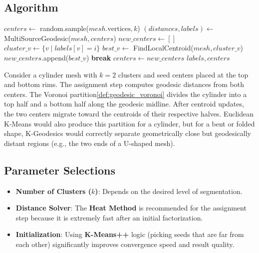 \subsection{Algorithm}
\begin{algorithm}
\caption{K-Geodesics Clustering\label{alg:k_geodesics}}
\begin{algorithmic}[1]
  \State $centers \gets$ random.sample($mesh.\text{vertices}, k$)
    \State $(distances, labels) \gets$ MultiSourceGeodesic($mesh, centers$)
    \State $new\_centers \gets []$
      \State $cluster\_v \gets \{v \mid labels[v] = i\}$
      \State $best\_v \gets$ FindLocalCentroid($mesh, cluster\_v$)
      \State $new\_centers$.append($best\_v$)
    \EndFor
     \textbf{break}
    \EndIf
    \State $centers \gets new\_centers$
  \EndWhile
  \State \Return $labels, centers$
\EndFunction
\end{algorithmic}
\end{algorithm}

\begin{example}\label{example:k_geodesics_cylinder}
Consider a cylinder mesh with $k = 2$ clusters and seed centers placed at the top and bottom rims. The assignment step computes geodesic distances from both centers. The Voronoi partition\cref{def:geodesic_voronoi} divides the cylinder into a top half and a bottom half along the geodesic midline. After centroid updates, the two centers migrate toward the centroids of their respective halves. Euclidean K-Means would also produce this partition for a cylinder, but for a bent or folded shape, K-Geodesics would correctly separate geometrically close but geodesically distant regions (e.g., the two ends of a U-shaped mesh).
\end{example}

\subsection{Parameter Selections}
\begin{itemize}
  \item \textbf{Number of Clusters ($k$)}: Depends on the desired level of segmentation.
  \item \textbf{Distance Solver}: The \textbf{Heat Method} \cite{crane2013geodesic} is recommended for the assignment step because it is extremely fast after an initial factorization.
  \item \textbf{Initialization}: Using \textbf{K-Means++} logic (picking seeds that are far from each other) significantly improves convergence speed and result quality.
\end{itemize}

